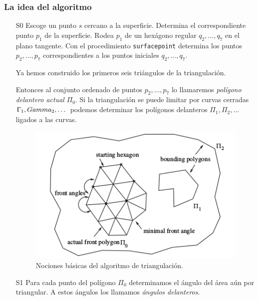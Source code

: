 \subsubsection{La idea del algoritmo}

\begin{enumerate}
	\item[S0] Escoge un punto $s$ cercano a la superficie. Determina el correspondiente punto $p_1$ de la superficie. Rodea $p_1$ de un hexágono regular $q_2, \dotso, q_7$ en el plano tangente. Con el procedimiento \texttt{surfacepoint} determina los puntos $p_2, \dotso, p_7$ correspondientes a los  puntos iniciales $q_2, \dotso, q_7$.
	\par Ya hemos construido los primeros seis triángulos de la triangulación.
	\par Entonces al conjunto ordenado de puntos $p_2, \dotso, p_7$ lo llamaremos{ \em polígono delantero actual} $\Pi_0$. Si la triangulación se puede limitar por curvas cerradas $\Gamma_1, \\Gamma_2,\dotso$ podemos determinar los polígonos delanteros $\Pi_1, \Pi_2, \dotso$ ligados a las curvas.
	
\begin{figure}[h]
	\centering
	\includegraphics[scale=0.7]{images/hartmann1.png}
	\caption{Nociones básicas del algoritmo de triangulación.}
\end{figure}	
	
	\item[S1] Para cada punto del polígono $\Pi_0$ determinamos el ángulo del área aún por triangular. A estos ángulos los llamamos{ \em ángulos delanteros}.
	

\end{enumerate}
